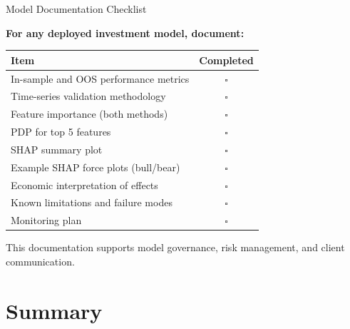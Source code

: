 \documentclass[10pt]{beamer}
\begin{document}
\begin{frame}{Model Documentation Checklist}

  \textbf{For any deployed investment model, document:}

  \vspace{0.3em}
  \begin{center}
  \begin{tabular}{lc}
    \toprule
    \textbf{Item} & \textbf{Completed} \\
    \midrule
    In-sample and OOS performance metrics & $\square$ \\
    Time-series validation methodology & $\square$ \\
    Feature importance (both methods) & $\square$ \\
    PDP for top 5 features & $\square$ \\
    SHAP summary plot & $\square$ \\
    Example SHAP force plots (bull/bear) & $\square$ \\
    Economic interpretation of effects & $\square$ \\
    Known limitations and failure modes & $\square$ \\
    Monitoring plan & $\square$ \\
    \bottomrule
  \end{tabular}
  \end{center}

  \vspace{0.3em}
  This documentation supports model governance, risk management, and client communication.
\end{frame}

\section{Summary}
\end{document}
